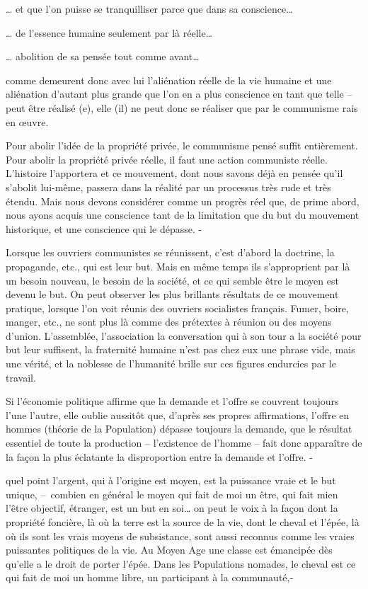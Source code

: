 \documentclass[french,twoside]{book} %
\begin{document}
… et que l’on puisse se tranquilliser parce que dans sa conscience…\par
… de l’essence humaine seulement par là réelle…\par
… abolition de sa pensée tout comme avant…\par
comme demeurent donc avec lui l’aliénation réelle de la vie humaine et une aliénation d’autant plus grande que l’on en a plus conscience en tant que telle – peut être réalisé (e), elle (il) ne peut donc se réaliser que par le communisme rais en œuvre.\par
Pour abolir l’idée de la propriété privée, le communisme pensé suffit entièrement. Pour abolir la propriété privée réelle, il faut une action communiste réelle. L’histoire l’apportera et ce mouvement, dont nous savons déjà en pensée qu’il s’abolit lui-même, passera dans la réalité par un processus très rude et très étendu. Mais nous devons considérer comme un progrès réel que, de prime abord, nous ayons acquis une conscience tant de la limitation que du but du mouvement historique, et une conscience qui le dépasse. -\par
Lorsque les ouvriers communistes se réunissent, c’est d’abord la doctrine, la propagande, etc., qui est leur but. Mais en même temps ils s’approprient par là un besoin nouveau, le besoin de la société, et ce qui semble être le moyen est devenu le but. On peut observer les plus brillants résultats de ce mouvement pratique, lorsque l’on voit réunis des ouvriers socialistes français. Fumer, boire, manger, etc., ne sont plus là comme des prétextes à réunion ou des moyens d’union. L’assemblée, l’association la conversation qui à son tour a la société pour but leur suffisent, la fraternité humaine n’est pas chez eux une phrase vide, mais une vérité, et la noblesse de l’humanité brille sur ces figures endurcies par le travail.\par
[XX] Si l’économie politique affirme que la demande et l’offre se couvrent toujours l’une l’autre, elle oublie aussitôt que, d’après ses propres affirmations, l’offre en hommes (théorie de la Population) dépasse toujours la demande, que le résultat essentiel de toute la production – l’existence de l’homme – fait donc apparaître de la façon la plus éclatante la disproportion entre la demande et l’offre. -\par
quel point l’argent, qui à l’origine est moyen, est la puissance vraie et le but unique, – combien en général le moyen qui fait de moi un être, qui fait mien l’être objectif, étranger, est un but en soi… on peut le voix à la façon dont la propriété foncière, là où la terre est la source de la vie, dont le cheval et l’épée, là où ils sont les vrais moyens de subsistance, sont aussi reconnus comme les vraies puissantes politiques de la vie. Au Moyen Age une classe est émancipée dès qu’elle a le droit de porter l’épée. Dans les Populations nomades, le cheval est ce qui fait de moi un homme libre, un participant à la communauté,-\par
\end{document}

